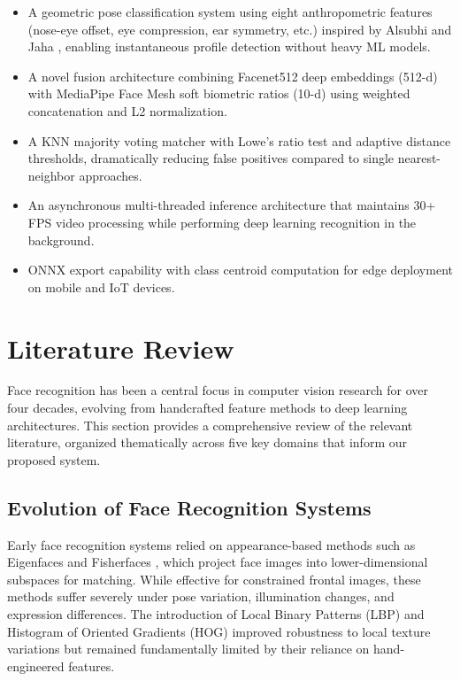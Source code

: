 \documentclass[conference]{IEEEtran}
\begin{document}
\begin{itemize}
\item A geometric pose classification system using eight anthropometric features (nose-eye offset, eye compression, ear symmetry, etc.) inspired by Alsubhi and Jaha \cite{b4}, enabling instantaneous profile detection without heavy ML models.
\item A novel fusion architecture combining Facenet512 deep embeddings (512-d) with MediaPipe Face Mesh soft biometric ratios (10-d) using weighted concatenation and L2 normalization.
\item A KNN majority voting matcher with Lowe's ratio test and adaptive distance thresholds, dramatically reducing false positives compared to single nearest-neighbor approaches.
\item An asynchronous multi-threaded inference architecture that maintains 30+ FPS video processing while performing deep learning recognition in the background.
\item ONNX export capability with class centroid computation for edge deployment on mobile and IoT devices.
\end{itemize}

\section{Literature Review}

Face recognition has been a central focus in computer vision research for over four decades, evolving from handcrafted feature methods to deep learning architectures. This section provides a comprehensive review of the relevant literature, organized thematically across five key domains that inform our proposed system.

\subsection{Evolution of Face Recognition Systems}

Early face recognition systems relied on appearance-based methods such as Eigenfaces \cite{b7} and Fisherfaces \cite{b8}, which project face images into lower-dimensional subspaces for matching. While effective for constrained frontal images, these methods suffer severely under pose variation, illumination changes, and expression differences. The introduction of Local Binary Patterns (LBP) \cite{b9} and Histogram of Oriented Gradients (HOG) improved robustness to local texture variations but remained fundamentally limited by their reliance on hand-engineered features.
\end{document}
